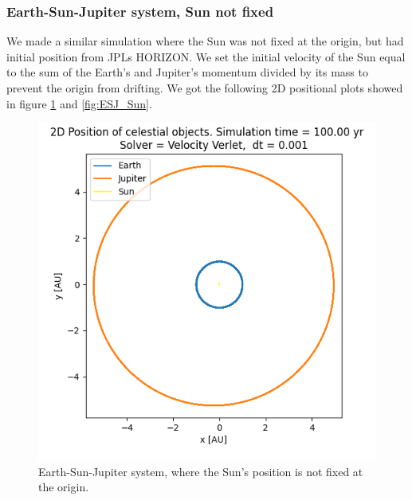 \documentclass[american,a4paper,12pt]{article}
\begin{document}
\subsubsection{Earth-Sun-Jupiter system, Sun not fixed}
\label{sec:Sun_not_fixed}
We made a similar simulation where the Sun was not fixed at the origin, but had initial position from JPLs HORIZON. We set the initial velocity of the Sun equal to the sum of the Earth's and Jupiter's momentum divided by its mass to prevent the origin from drifting. We got the following 2D positional plots showed in figure \ref{fig:ESJ_unfixed} and \ref{fig:ESJ_Sun}.
\begin{figure}[H]
  \centering
  \begin{minipage}[b]{0.49\textwidth}
    \includegraphics[width=\textwidth]{figures/ESJ.png}
    \caption{Earth-Sun-Jupiter system, where the Sun's position is not fixed at the origin.}
    \label{fig:ESJ_unfixed}
  \end{minipage}
  \hfill
  \begin{minipage}[b]{0.49\textwidth}

\end{minipage}
\end{figure}
\end{document}
